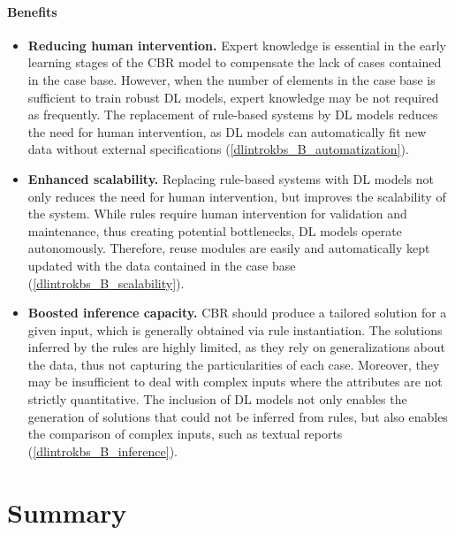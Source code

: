 \paragraph{Benefits}
\begin{itemize}
    \item \textbf{Reducing human intervention.} Expert knowledge is essential in the early learning stages of the CBR model to compensate the lack of cases contained in the case base. However, when the number of elements in the case base is sufficient to train robust DL models, expert knowledge may be not required as frequently. The replacement of rule-based systems by DL models reduces the need for human intervention, as DL models can automatically fit new data without external specifications (\ref{dlintrokbs_B_automatization}).
    
    \item \textbf{Enhanced scalability.} Replacing rule-based systems with DL models not only reduces the need for human intervention, but improves the scalability of the system. While rules require human intervention for validation and maintenance, thus creating potential bottlenecks, DL models operate autonomously. Therefore, reuse modules are easily and automatically kept updated with the data contained in the case base (\ref{dlintrokbs_B_scalability}).
    
    \item \textbf{Boosted inference capacity.} CBR should produce a tailored solution for a given input, which is generally obtained via rule instantiation. The solutions inferred by the rules are highly limited, as they rely on generalizations about the data, thus not capturing the particularities of each case. Moreover, they may be insufficient to deal with complex inputs where the attributes are not strictly quantitative. The inclusion of DL models not only enables the generation of solutions that could not be inferred from rules, but also enables the comparison of complex inputs, such as textual reports (\ref{dlintrokbs_B_inference}).
\end{itemize}

\section{Summary}\label{5_sec:summary}
